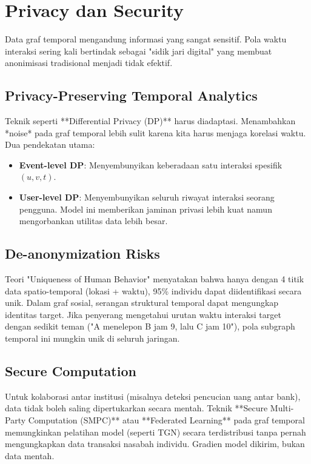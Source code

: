 \documentclass[12pt,a4paper]{book}
\begin{document}
\chapter{Privacy dan Security}
Data graf temporal mengandung informasi yang sangat sensitif. Pola waktu interaksi sering kali bertindak sebagai "sidik jari digital" yang membuat anonimisasi tradisional menjadi tidak efektif.

\section{Privacy-Preserving Temporal Analytics}
Teknik seperti **Differential Privacy (DP)** harus diadaptasi. Menambahkan *noise* pada graf temporal lebih sulit karena kita harus menjaga korelasi waktu.
Dua pendekatan utama:
\begin{itemize}
    \item \textbf{Event-level DP}: Menyembunyikan keberadaan satu interaksi spesifik $(u, v, t)$.
    \item \textbf{User-level DP}: Menyembunyikan seluruh riwayat interaksi seorang pengguna. Model ini memberikan jaminan privasi lebih kuat namun mengorbankan utilitas data lebih besar.
\end{itemize}

\section{De-anonymization Risks}
Teori "Uniqueness of Human Behavior" menyatakan bahwa hanya dengan 4 titik data spatio-temporal (lokasi + waktu), 95\% individu dapat diidentifikasi secara unik.
Dalam graf sosial, serangan struktural temporal dapat mengungkap identitas target. Jika penyerang mengetahui urutan waktu interaksi target dengan sedikit teman ("A menelepon B jam 9, lalu C jam 10"), pola subgraph temporal ini mungkin unik di seluruh jaringan.

\section{Secure Computation}
Untuk kolaborasi antar institusi (misalnya deteksi pencucian uang antar bank), data tidak boleh saling dipertukarkan secara mentah.
Teknik **Secure Multi-Party Computation (SMPC)** atau **Federated Learning** pada graf temporal memungkinkan pelatihan model (seperti TGN) secara terdistribusi tanpa pernah mengungkapkan data transaksi nasabah individu. Gradien model dikirim, bukan data mentah.
\end{document}
